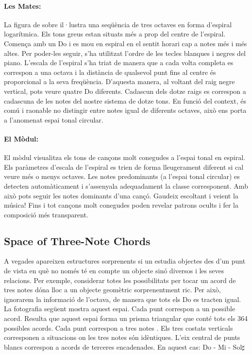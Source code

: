 \paragraph{Les Mates:} La figura de sobre il·lustra una seqüència de tres octaves en forma d'espiral logarítmica. Els tons greus estan situats més a prop del centre de l'espiral. Comença amb un Do i es mou en espiral en el sentit horari cap a notes més i més altes. Per poder-les seguir, s'ha utilitzat l'ordre de les tecles blanques i negres del piano. L'escala de l'espiral s'ha triat de manera que a cada volta completa es correspon a una octava i la distància de qualsevol punt fins al centre és proporcional a la seva freqüència. D'aquesta manera, al voltant del raig negre vertical, pots veure quatre Do diferents. Cadascun dels dotze raigs es correspon a cadascuna de les notes del nostre sistema de dotze tons. En funció del context, és comú i raonable no distingir entre notes igual de diferents octaves, això ens porta a l'anomenat espai tonal circular. 

\paragraph{El Mòdul:} El mòdul visualitza els tons de cançons molt conegudes a l'espai tonal en espiral. Els paràmetres d'escala de l'espiral es trien de forma lleugerament diferent si cal veure més o menys octaves. Les notes predominants (a l'espai tonal circular) es detecten automàticament i s'assenyala adequadament la classe corresponent. Amb això pots seguir les notes dominants d'una cançó. Gaudeix escoltant i veient la música! Fins i tot cançons molt conegudes poden revelar patrons ocults i fer la composició més transparent.  

\subsection{Space of Three-Note Chords}
A vegades apareixen estructures sorprenents si un estudia objectes des d'un punt de vista en què no només té en compte un objecte sinó diversos i les seves relacions. Per exemple, considerar totes les possibilitats per tocar un acord de tres notes dóna lloc a un objecte geomètric sorprenentment ric. Per això, ignorarem la informació de l'octava, de manera que tots els Do es tracten igual. La fotografia següent mostra aquest espai. Cada punt correspon a un possible acord. Resulta que aquest espai forma un prisma triangular que conté tots els 364 possibles acords. Cada punt correspon a tres notes . Els tres costats verticals corresponen a situacions on les tres notes són idèntiques. L'eix central de punts blancs correspon a acords de terceres encadenades. En aquest cas: Do - Mi - Sol$\sharp$


